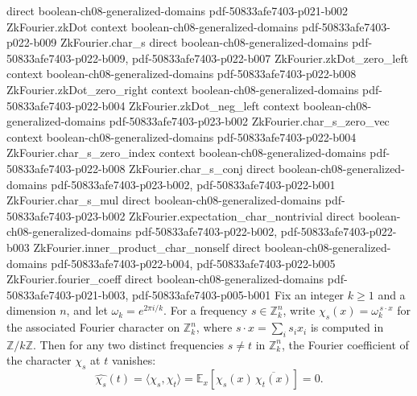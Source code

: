 \begin{lemma}
  {direct}
  {boolean-ch08-generalized-domains}
  {pdf-50833afe7403-p021-b002}
\proofstep
  {ZkFourier.zkDot}
  {context}
  {boolean-ch08-generalized-domains}
  {pdf-50833afe7403-p022-b009}
\proofstep
  {ZkFourier.char_s}
  {direct}
  {boolean-ch08-generalized-domains}
  {pdf-50833afe7403-p022-b009,
    pdf-50833afe7403-p022-b007}
\proofstep
  {ZkFourier.zkDot_zero_left}
  {context}
  {boolean-ch08-generalized-domains}
  {pdf-50833afe7403-p022-b008}
\proofstep
  {ZkFourier.zkDot_zero_right}
  {context}
  {boolean-ch08-generalized-domains}
  {pdf-50833afe7403-p022-b004}
\proofstep
  {ZkFourier.zkDot_neg_left}
  {context}
  {boolean-ch08-generalized-domains}
  {pdf-50833afe7403-p023-b002}
\proofstep
  {ZkFourier.char_s_zero_vec}
  {context}
  {boolean-ch08-generalized-domains}
  {pdf-50833afe7403-p022-b004}
\proofstep
  {ZkFourier.char_s_zero_index}
  {context}
  {boolean-ch08-generalized-domains}
  {pdf-50833afe7403-p022-b008}
\proofstep
  {ZkFourier.char_s_conj}
  {direct}
  {boolean-ch08-generalized-domains}
  {pdf-50833afe7403-p023-b002,
    pdf-50833afe7403-p022-b001}
\proofstep
  {ZkFourier.char_s_mul}
  {direct}
  {boolean-ch08-generalized-domains}
  {pdf-50833afe7403-p023-b002}
\proofstep
  {ZkFourier.expectation_char_nontrivial}
  {direct}
  {boolean-ch08-generalized-domains}
  {pdf-50833afe7403-p022-b002,
    pdf-50833afe7403-p022-b003}
\proofstep
  {ZkFourier.inner_product_char_nonself}
  {direct}
  {boolean-ch08-generalized-domains}
  {pdf-50833afe7403-p022-b004,
    pdf-50833afe7403-p022-b005}
\proofstep
  {ZkFourier.fourier_coeff}
  {direct}
  {boolean-ch08-generalized-domains}
  {pdf-50833afe7403-p021-b003,
    pdf-50833afe7403-p005-b001}
Fix an integer $k \ge 1$ and a dimension $n$, and let $\omega_k = e^{2\pi i / k}$. For a
frequency $s \in \mathbb{Z}_k^n$, write $\chi_s(x) = \omega_k^{\,s \cdot x}$ for the
associated Fourier character on $\mathbb{Z}_k^n$, where $s \cdot x = \sum_{i} s_i x_i$
is computed in $\mathbb{Z}/k\mathbb{Z}$. Then for any two distinct frequencies $s \ne t$
in $\mathbb{Z}_k^n$, the Fourier coefficient of the character $\chi_s$ at $t$ vanishes:
\[
\widehat{\chi_s}(t) = \langle \chi_s, \chi_t \rangle =
\mathbb{E}_{x}\!\left[\chi_s(x)\,\overline{\chi_t(x)}\right] = 0.
\]
\end{lemma}

